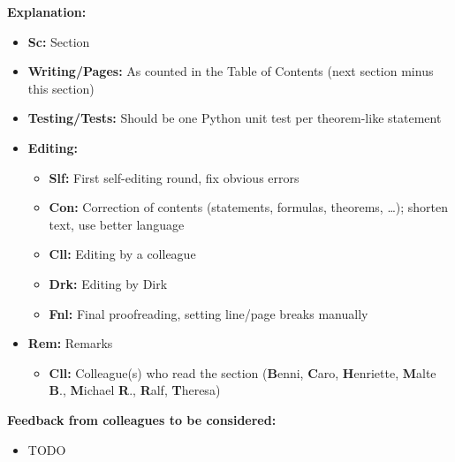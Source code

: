 \clearpage

\noindent
\textbf{Explanation:}

\begin{itemize}
  \item
  \textbf{Sc:}
  Section
  
  \item
  \textbf{Writing/Pages:}
  As counted in the Table of Contents
  (next section minus this section)
  
  \item
  \textbf{Testing/Tests:}
  Should be one Python unit test per theorem-like statement
  
  \item
  \textbf{Editing:}
  \begin{itemize}
    \item
    \textbf{Slf:}
    First self-editing round, fix obvious errors
    
    \item
    \textbf{Con:}
    Correction of contents (statements, formulas, theorems, \dots);
    shorten text, use better language
    
    \item
    \textbf{Cll:}
    Editing by a colleague
    
    \item
    \textbf{Drk:}
    Editing by Dirk
    
    \item
    \textbf{Fnl:}
    Final proofreading, setting line/page breaks manually
  \end{itemize}
  
  \item
  \textbf{Rem:}
  Remarks
  \begin{itemize}
    \item
    \textbf{Cll:}
    Colleague(s) who read the section
    (\textbf{B}enni,
    \textbf{C}aro,
    \textbf{H}enriette,
    \textbf{M}alte \textbf{B}.,
    \textbf{M}ichael \textbf{R}.,
    \textbf{R}alf,
    \textbf{T}heresa)
  \end{itemize}
\end{itemize}

\noindent
\textbf{Feedback from colleagues to be considered:}

\begin{itemize}
  \item
  TODO
\end{itemize}

\cleardoublepage
